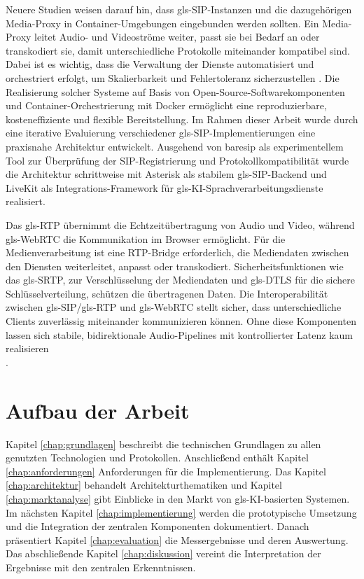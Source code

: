 Neuere Studien weisen darauf hin, dass \gls{gls-SIP}-Instanzen und die dazugehörigen Media-Proxy in Container-Umgebungen eingebunden werden sollten. Ein Media-Proxy leitet Audio- und Videoströme weiter, passt sie bei Bedarf an oder transkodiert sie, damit unterschiedliche Protokolle miteinander kompatibel sind. Dabei ist es wichtig, dass die Verwaltung der Dienste automatisiert und orchestriert erfolgt, um Skalierbarkeit und Fehlertoleranz sicherzustellen \parencite{Antonova2025}. Die Realisierung solcher Systeme auf Basis von Open-Source-Softwarekomponenten und Container-Orchestrierung mit Docker ermöglicht eine reproduzierbare, kosteneffiziente und flexible Bereitstellung. Im Rahmen dieser Arbeit wurde durch eine iterative Evaluierung verschiedener \gls{gls-SIP}-Implementierungen eine praxisnahe Architektur entwickelt. Ausgehend von baresip als experimentellem Tool zur Überprüfung der SIP-Registrierung und Protokollkompatibilität wurde die Architektur schrittweise mit Asterisk als stabilem \gls{gls-SIP}-Backend und LiveKit als Integrations-Framework für \gls{gls-KI}-Sprachverarbeitungsdienste realisiert.

Das \gls{gls-RTP} übernimmt die Echtzeitübertragung von Audio und Video, während \gls{gls-WebRTC} die Kommunikation im Browser ermöglicht. Für die Medienverarbeitung ist eine RTP-Bridge erforderlich, die Mediendaten zwischen den Diensten weiterleitet, anpasst oder transkodiert. Sicherheitsfunktionen wie das \gls{gls-SRTP}, zur Verschlüsselung der Mediendaten und \gls{gls-DTLS} für die sichere Schlüsselverteilung, schützen die übertragenen Daten. Die Interoperabilität zwischen \gls{gls-SIP}/\gls{gls-RTP} und \gls{gls-WebRTC} stellt sicher, dass unterschiedliche Clients zuverlässig miteinander kommunizieren können. Ohne diese Komponenten lassen sich stabile, bidirektionale Audio-Pipelines mit kontrollierter Latenz kaum realisieren\\ \parencite{Antonova2025, ReliabilityVirtualizedNetworks}.

\section{Aufbau der Arbeit}
 Kapitel \ref{chap:grundlagen} beschreibt die technischen Grundlagen zu allen genutzten Technologien und Protokollen. Anschlie\ss end enthält Kapitel \ref{chap:anforderungen} Anforderungen für die Implementierung. Das Kapitel \ref{chap:architektur} behandelt Architekturthematiken und Kapitel \ref{chap:marktanalyse} gibt Einblicke in den Markt von \gls{gls-KI}-basierten Systemen. Im nächsten Kapitel \ref{chap:implementierung} werden die prototypische Umsetzung und die Integration der zentralen Komponenten dokumentiert. Danach präsentiert Kapitel \ref{chap:evaluation} die Messergebnisse und deren Auswertung.
Das abschlie\ss ende Kapitel \ref{chap:diskussion} vereint die Interpretation der Ergebnisse mit den zentralen Erkenntnissen.

